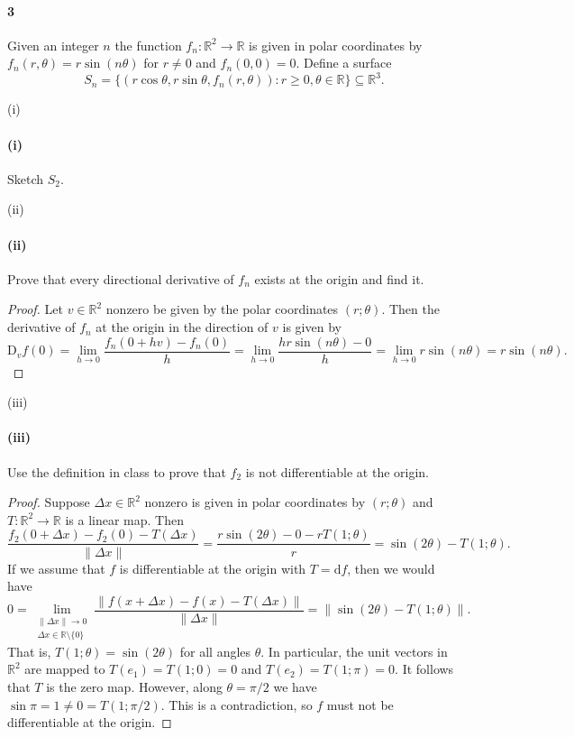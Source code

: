 \documentclass[12pt]{article}
\newlength{\myparskip}
\newenvironment{fullbox}{\begin{lrbox}{\savefullbox}\begin{minipage}{\dimexpr\textwidth-2\fboxsep\relax}\setlength{\parskip}{\myparskip}}{\end{minipage}\end{lrbox}\framebox[\textwidth]{\usebox{\savefullbox}}}
\newenvironment{pbox}[1][]{\begin{fullbox}\ifx#1\empty\else\paragraph{#1}\phantom{}\fi}{\end{fullbox}}
\theoremstyle{definition}
\newcommand{\R}{\mathbb{R}}
\newcommand{\<}{\langle}
\renewcommand{\>}{\rangle}
\newcommand{\seq}{\subseteq}
\newcommand{\dd}{\mathrm{d}}
\newcommand{\DD}{\mathrm{D}}
\begin{document}
\begin{pbox}[3]
    Given an integer $n$ the function $f_n : \R^2 \to \R$ is given in polar coordinates by $f_n(r, \theta) = r \sin(n\theta)$ for $r \ne 0$ and $f_n(0, 0) = 0$.
    Define a surface
    \[
        S_n = \{(r \cos\theta, r \sin\theta, f_n(r, \theta)) : r \geq 0, \theta \in \R\} \seq \R^3.
    \]
\end{pbox}

\begin{pbox}[(i)]
    Sketch $S_2$.
\end{pbox}

\begin{pbox}[(ii)]
    Prove that every directional derivative of $f_n$ exists at the origin and find it.
\end{pbox}

\begin{proof}
    Let $v \in \R^2$ nonzero be given by the polar coordinates $(r; \theta)$.
    Then the derivative of $f_n$ at the origin in the direction of $v$ is given by
    \[
        \DD_v f(0)
            = \lim_{h \to 0} \frac{f_n(0 + hv) - f_n(0)}{h}
            = \lim_{h \to 0} \frac{hr\sin(n\theta) - 0}{h}
            = \lim_{h \to 0} r\sin(n\theta)
            = r\sin(n\theta).
    \]
\end{proof}

\begin{pbox}[(iii)]
    Use the definition in class to prove that $f_2$ is not differentiable at the origin.
\end{pbox}

\begin{proof}
    Suppose $\Delta x \in \R^2$ nonzero is given in polar coordinates by $(r; \theta)$ and $T : \R^2 \to \R$ is a linear map.
    Then
    \[
        \frac{f_2(0 + \Delta x) - f_2(0) - T(\Delta x)}{\|\Delta x\|}
            = \frac{r\sin(2\theta) - 0 - rT(1; \theta)}{r}
            = \sin(2\theta) - T(1; \theta).
    \]
    If we assume that $f$ is differentiable at the origin with $T = \dd{f}$, then we would have
    \[
        0
            = \lim_{\substack{\|\Delta x\| \to 0 \\ \Delta x \in \R \setminus \{0\}}} \frac{\|f(x + \Delta x) - f(x)  - T(\Delta x)\|}{\|\Delta x\|}
            = \|\sin(2\theta) - T(1; \theta)\|.
    \]
    That is, $T(1; \theta) = \sin(2\theta)$ for all angles $\theta$.
    In particular, the unit vectors in $\R^2$ are mapped to $T(e_1) = T(1; 0) = 0 $ and $T(e_2) = T(1; \pi) = 0$.
    It follows that $T$ is the zero map.
    However, along $\theta = \pi/2$ we have $\sin\pi = 1 \ne 0 = T(1; \pi/2)$.
    This is a contradiction, so $f$ must not be differentiable at the origin.
\end{proof}
\end{document}
